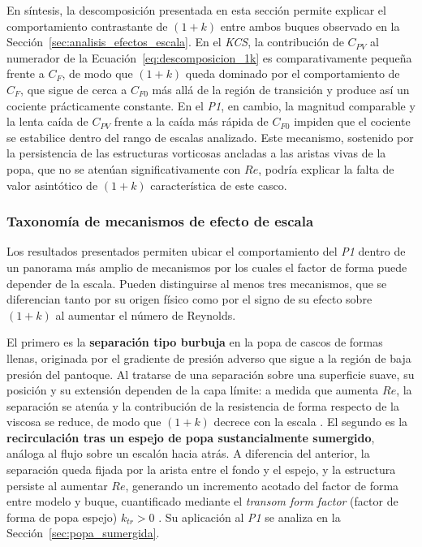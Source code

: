 En síntesis, la descomposición presentada en esta sección permite explicar el 
comportamiento contrastante de $(1+k)$ entre ambos buques observado en la 
Sección~\ref{sec:analisis_efectos_escala}. En el \textit{KCS}, la contribución de 
$C_{PV}$ al numerador de la Ecuación~\eqref{eq:descomposicion_1k} es 
comparativamente pequeña frente a $C_F$, de modo que $(1+k)$ queda dominado 
por el comportamiento de $C_F$, que sigue de cerca a $C_{F0}$ más allá de la 
región de transición y produce así un cociente prácticamente constante. En 
el \textit{P1}, en cambio, la magnitud comparable y la lenta caída de 
$C_{PV}$ frente a la caída más rápida de $C_{F0}$ impiden que el cociente se 
estabilice dentro del rango de escalas analizado. Este mecanismo, sostenido 
por la persistencia de las estructuras vorticosas ancladas a las aristas 
vivas de la popa, que no se atenúan significativamente con $Re$, podría 
explicar la falta de valor 
asintótico de $(1+k)$ característica de este casco.

\subsubsection*{Taxonomía de mecanismos de efecto de escala}

Los resultados presentados permiten ubicar el comportamiento del
\textit{P1} dentro de un panorama más amplio de mecanismos por los cuales
el factor de forma puede depender de la escala. Pueden distinguirse al
menos tres mecanismos, que se diferencian tanto por su origen físico como
por el signo de su efecto sobre $(1+k)$ al aumentar el número de Reynolds.

El primero es la \textbf{separación tipo burbuja} en la popa de cascos de
formas llenas, originada por el gradiente de presión adverso que sigue a la
región de baja presión del pantoque. Al tratarse de una separación sobre
una superficie suave, su posición y su extensión dependen de la capa
límite: a medida que aumenta $Re$, la separación se atenúa y la
contribución de la resistencia de forma respecto de la viscosa se reduce,
de modo que $(1+k)$ decrece con la escala
\citep{korkmaz-verif-and-valid-cfd-efd}. El segundo es la
\textbf{recirculación tras un espejo de popa sustancialmente sumergido},
análoga al flujo sobre un escalón hacia atrás. A diferencia del anterior,
la separación queda fijada por la arista entre el fondo y el espejo, y la
estructura persiste al aumentar $Re$, generando un incremento acotado del
factor de forma entre modelo y buque, cuantificado mediante el
\textit{transom form factor} (factor de forma de popa espejo) $k_{tr}>0$
\citep{korkmaz_wetted_transom}. Su aplicación al \textit{P1} se analiza en
la Sección~\ref{sec:popa_sumergida}.

